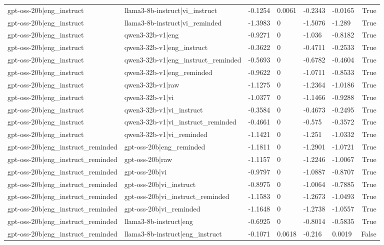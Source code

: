 \begin{table}
\begin{tabular}{llllllr}
gpt-oss-20b|eng_instruct & llama3-8b-instruct|vi_instruct & -0.1254 & 0.0061 & -0.2343 & -0.0165 & True \\
gpt-oss-20b|eng_instruct & llama3-8b-instruct|vi_reminded & -1.3983 & 0 & -1.5076 & -1.289 & True \\
gpt-oss-20b|eng_instruct & qwen3-32b-v1|eng & -0.9271 & 0 & -1.036 & -0.8182 & True \\
gpt-oss-20b|eng_instruct & qwen3-32b-v1|eng_instruct & -0.3622 & 0 & -0.4711 & -0.2533 & True \\
gpt-oss-20b|eng_instruct & qwen3-32b-v1|eng_instruct_reminded & -0.5693 & 0 & -0.6782 & -0.4604 & True \\
gpt-oss-20b|eng_instruct & qwen3-32b-v1|eng_reminded & -0.9622 & 0 & -1.0711 & -0.8533 & True \\
gpt-oss-20b|eng_instruct & qwen3-32b-v1|raw & -1.1275 & 0 & -1.2364 & -1.0186 & True \\
gpt-oss-20b|eng_instruct & qwen3-32b-v1|vi & -1.0377 & 0 & -1.1466 & -0.9288 & True \\
gpt-oss-20b|eng_instruct & qwen3-32b-v1|vi_instruct & -0.3584 & 0 & -0.4673 & -0.2495 & True \\
gpt-oss-20b|eng_instruct & qwen3-32b-v1|vi_instruct_reminded & -0.4661 & 0 & -0.575 & -0.3572 & True \\
gpt-oss-20b|eng_instruct & qwen3-32b-v1|vi_reminded & -1.1421 & 0 & -1.251 & -1.0332 & True \\
gpt-oss-20b|eng_instruct_reminded & gpt-oss-20b|eng_reminded & -1.1811 & 0 & -1.2901 & -1.0721 & True \\
gpt-oss-20b|eng_instruct_reminded & gpt-oss-20b|raw & -1.1157 & 0 & -1.2246 & -1.0067 & True \\
gpt-oss-20b|eng_instruct_reminded & gpt-oss-20b|vi & -0.9797 & 0 & -1.0887 & -0.8707 & True \\
gpt-oss-20b|eng_instruct_reminded & gpt-oss-20b|vi_instruct & -0.8975 & 0 & -1.0064 & -0.7885 & True \\
gpt-oss-20b|eng_instruct_reminded & gpt-oss-20b|vi_instruct_reminded & -1.1583 & 0 & -1.2673 & -1.0493 & True \\
gpt-oss-20b|eng_instruct_reminded & gpt-oss-20b|vi_reminded & -1.1648 & 0 & -1.2738 & -1.0557 & True \\
gpt-oss-20b|eng_instruct_reminded & llama3-8b-instruct|eng & -0.6925 & 0 & -0.8014 & -0.5835 & True \\
gpt-oss-20b|eng_instruct_reminded & llama3-8b-instruct|eng_instruct & -0.1071 & 0.0618 & -0.216 & 0.0019 & False \\

\end{tabular}
\end{table}
